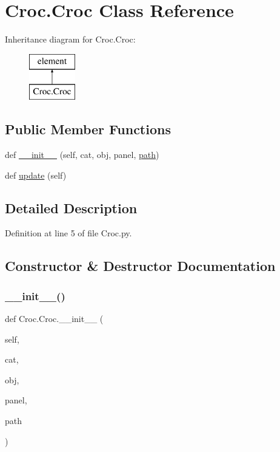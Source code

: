 \hypertarget{classCroc_1_1Croc}{}\section{Croc.\+Croc Class Reference}
\label{classCroc_1_1Croc}
Inheritance diagram for Croc.\+Croc\+:\begin{figure}[H]
\begin{center}
\leavevmode
\includegraphics[height=2.000000cm]{classCroc_1_1Croc}
\end{center}
\end{figure}
\subsection*{Public Member Functions}
\begin{DoxyCompactItemize}
\item 
def \hyperlink{classCroc_1_1Croc_a4a51e90cde54760e398c4c43ea9dbd98}{\+\_\+\+\_\+init\+\_\+\+\_\+} (self, cat, obj, panel, \hyperlink{classHierarchy_aa7990fa7caf132d83e361ce033c6c65a}{path})
\item 
def \hyperlink{classCroc_1_1Croc_ae4ec968c843b562cf39bb95246353a79}{update} (self)
\end{DoxyCompactItemize}


\subsection{Detailed Description}


Definition at line 5 of file Croc.\+py.



\subsection{Constructor \& Destructor Documentation}
\mbox{\label{classCroc_1_1Croc_a4a51e90cde54760e398c4c43ea9dbd98}} 
\subsubsection{\texorpdfstring{\+\_\+\+\_\+init\+\_\+\+\_\+()}{\_\_init\_\_()}}
{\footnotesize\ttfamily def Croc.\+Croc.\+\_\+\+\_\+init\+\_\+\+\_\+ (\begin{DoxyParamCaption}\item[{}]{self,  }\item[{}]{cat,  }\item[{}]{obj,  }\item[{}]{panel,  }\item[{}]{path }\end{DoxyParamCaption})}



